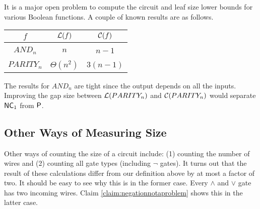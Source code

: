 \documentclass[11pt]{article}
\begin{document}
	\begin{example}
		It is a major open problem to compute the circuit and leaf size lower bounds for various Boolean functions. A couple of known results are as follows.
		\begin{center}
			\begin{tabular}{c|c|c}
				$f$ 		& $\mathcal{L}(f)$ 	& $\mathcal{C}(f)$\\ \hline
				&&\\[-1em]
				$AND_n$ 	& $n$ 				& $n-1$\\ \hline
				&&\\[-1em]
				$PARITY_n$ 	& $\Theta\left(n^2\right)$ 	& $3(n-1)$\\
			\end{tabular}
		\end{center}
		The results for $AND_n$ are tight since the output depends on all the inputs. Improving the gap size between $\mathcal{L}(PARITY_n)$ and $\mathcal{C}(PARITY_n)$ would separate $\mathsf{NC}_1$ from $\mathsf{P}$.
	\end{example}
	
	\subsection{Other Ways of Measuring Size}
	Other ways of counting the size of a circuit include: (1) counting the number of wires and (2) counting all gate types (including $\lnot$ gates). It turns out that the result of these calculations differ from our definition above by at most a factor of two. It should be easy to see why this is in the former case. Every $\land$ and $\lor$ gate has two incoming wires. Claim \ref{claim:negationnotaproblem} shows this in the latter case.
	
\end{document}
